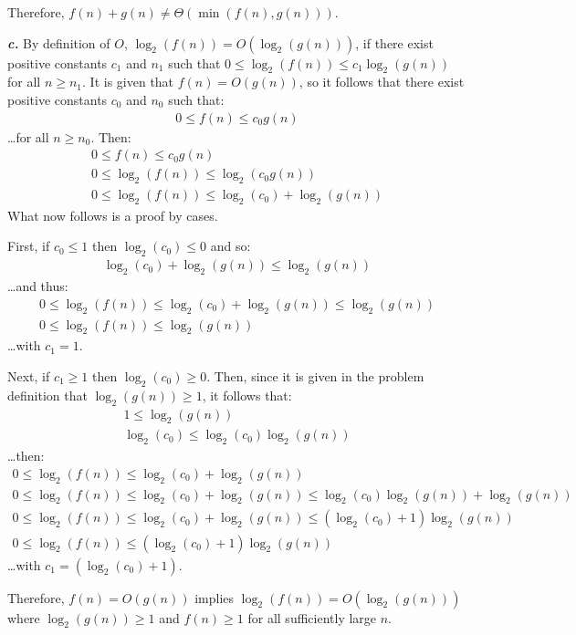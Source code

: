 \documentclass{article}
\begin{document}
Therefore, $f(n) + g(n) \neq \Theta(\min(f(n),g(n)))$.

\noindent\textbf{\textit{c.}} By definition of $O$, $\log_2(f(n)) = O(\log_2(g(n)))$, if there exist positive constants $c_1$ and $n_1$ such that $0 \leq \log_2(f(n)) \leq c_1 \log_2(g(n))$ for all $n \geq n_1$. It is given that $f(n) = O(g(n))$, so it follows that there exist positive constants $c_0$ and $n_0$ such that:
\begin{eqnarray*}
	0 \leq f(n) \leq c_0 g(n)
\end{eqnarray*}
\ldots for all $n \geq n_0$. Then:
\begin{eqnarray*}
	0 \leq f(n) \leq c_0 g(n) \\
	0 \leq \log_2(f(n)) \leq \log_2(c_0g(n)) \\
	0 \leq \log_2(f(n)) \leq \log_2(c_0) + \log_2(g(n))
\end{eqnarray*}
What now follows is a proof by cases.

First, if $c_0 \leq 1$ then $\log_2(c_0) \leq 0$ and so:
\begin{eqnarray*}
	\log_2(c_0) + \log_2(g(n)) \leq \log_2(g(n))
\end{eqnarray*}
\ldots and thus:
\begin{eqnarray*}
	0 \leq \log_2(f(n)) \leq \log_2(c_0) + \log_2(g(n)) \leq \log_2(g(n)) \\
	0 \leq \log_2(f(n)) \leq \log_2(g(n))
\end{eqnarray*}
\ldots with $c_1 = 1$.

Next, if $c_1 \geq 1$ then $\log_2(c_0) \geq 0$. Then, since it is given in the problem definition that $\log_2(g(n)) \geq 1$, it follows that:
\begin{eqnarray*}
	1 \leq \log_2(g(n)) \\
	\log_2(c_0) \leq \log_2(c_0)\log_2(g(n))
\end{eqnarray*}
\ldots then:
\begin{eqnarray*}
	0 \leq \log_2(f(n)) \leq \log_2(c_0) + \log_2(g(n)) \\
	0 \leq \log_2(f(n)) \leq \log_2(c_0) + \log_2(g(n)) \leq \log_2(c_0)\log_2(g(n)) + \log_2(g(n)) \\
	0 \leq \log_2(f(n)) \leq \log_2(c_0) + \log_2(g(n)) \leq (\log_2(c_0) + 1)\log_2(g(n)) \\
	0 \leq \log_2(f(n)) \leq (\log_2(c_0) + 1)\log_2(g(n))
\end{eqnarray*}
\ldots with $c_1 = (\log_2(c_0) + 1)$.

Therefore, $f(n) = O(g(n))$ implies $\log_2(f(n)) = O(\log_2(g(n)))$ where $\log_2(g(n)) \geq 1$ and $f(n) \geq 1$ for all sufficiently large $n$.
\end{document}
